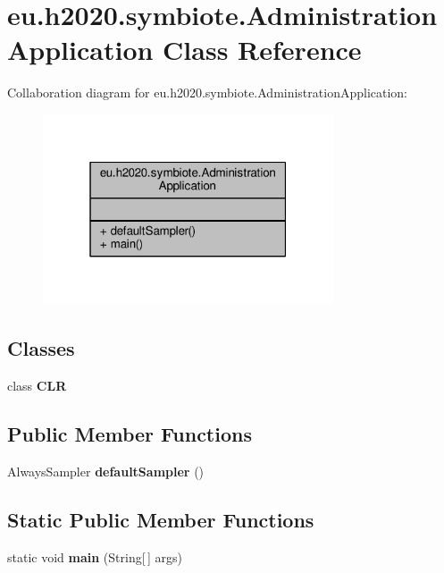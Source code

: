 \hypertarget{classeu_1_1h2020_1_1symbiote_1_1AdministrationApplication}{}\section{eu.\+h2020.\+symbiote.\+Administration\+Application Class Reference}
\label{classeu_1_1h2020_1_1symbiote_1_1AdministrationApplication}


Collaboration diagram for eu.\+h2020.\+symbiote.\+Administration\+Application\+:
\nopagebreak
\begin{figure}[H]
\begin{center}
\leavevmode
\includegraphics[width=244pt]{classeu_1_1h2020_1_1symbiote_1_1AdministrationApplication__coll__graph}
\end{center}
\end{figure}
\subsection*{Classes}
\begin{DoxyCompactItemize}
\item 
class {\bfseries C\+LR}
\end{DoxyCompactItemize}
\subsection*{Public Member Functions}
\begin{DoxyCompactItemize}
\item 
Always\+Sampler {\bfseries default\+Sampler} ()\hypertarget{classeu_1_1h2020_1_1symbiote_1_1AdministrationApplication_acb22f0581e401a988bae1d71fa5a2846}{}\label{classeu_1_1h2020_1_1symbiote_1_1AdministrationApplication_acb22f0581e401a988bae1d71fa5a2846}

\end{DoxyCompactItemize}
\subsection*{Static Public Member Functions}
\begin{DoxyCompactItemize}
\item 
static void {\bfseries main} (String\mbox{[}$\,$\mbox{]} args)\hypertarget{classeu_1_1h2020_1_1symbiote_1_1AdministrationApplication_aff5b1818698eef500f840eb62d696999}{}\label{classeu_1_1h2020_1_1symbiote_1_1AdministrationApplication_aff5b1818698eef500f840eb62d696999}

\end{DoxyCompactItemize}


